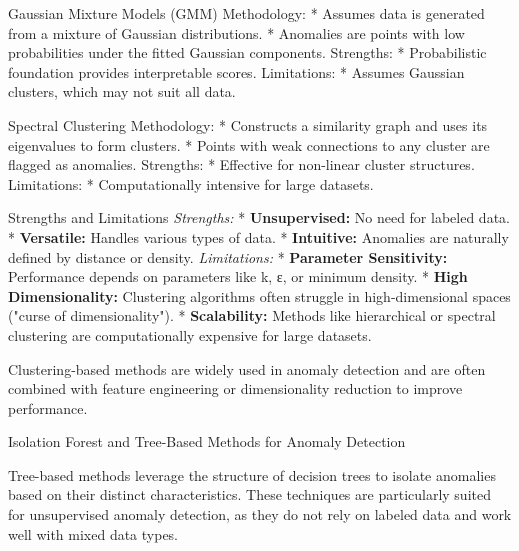 \secc Gaussian Mixture Models (GMM)
Methodology:
\begitems
 * Assumes data is generated from a mixture of Gaussian distributions.
* Anomalies are points with low probabilities under the fitted Gaussian components.
\enditems
\nl
Strengths:
\begitems
* Probabilistic foundation provides interpretable scores.
\enditems
\nl
Limitations:
\begitems
* Assumes Gaussian clusters, which may not suit all data.
\enditems

\secc Spectral Clustering
Methodology:
\begitems
* Constructs a similarity graph and uses its eigenvalues to form clusters.
* Points with weak connections to any cluster are flagged as anomalies.
\enditems
Strengths:
\begitems
* Effective for non-linear cluster structures.
\enditems
Limitations:
\begitems
* Computationally intensive for large datasets.
\enditems

\secc Strengths and Limitations
{\em Strengths:}
\begitems
* {\bf Unsupervised:} No need for labeled data.
* {\bf Versatile:} Handles various types of data.
* {\bf Intuitive:} Anomalies are naturally defined by distance or density.
\enditems
{\em Limitations:}
\begitems
* {\bf Parameter Sensitivity:} Performance depends on parameters like k, ε, or minimum density.
* {\bf High Dimensionality:} Clustering algorithms often struggle in high-dimensional spaces ("curse of dimensionality").
* {\bf Scalability:} Methods like hierarchical or spectral clustering are computationally expensive for large datasets.
\enditems

Clustering-based methods are widely used in anomaly detection and are often combined with feature engineering or dimensionality reduction to improve performance.

\sec Isolation Forest and Tree-Based Methods for Anomaly Detection

Tree-based methods leverage the structure of decision trees to isolate anomalies based on their distinct characteristics. These techniques are particularly suited for unsupervised anomaly detection, as they do not rely on labeled data and work well with mixed data types.

